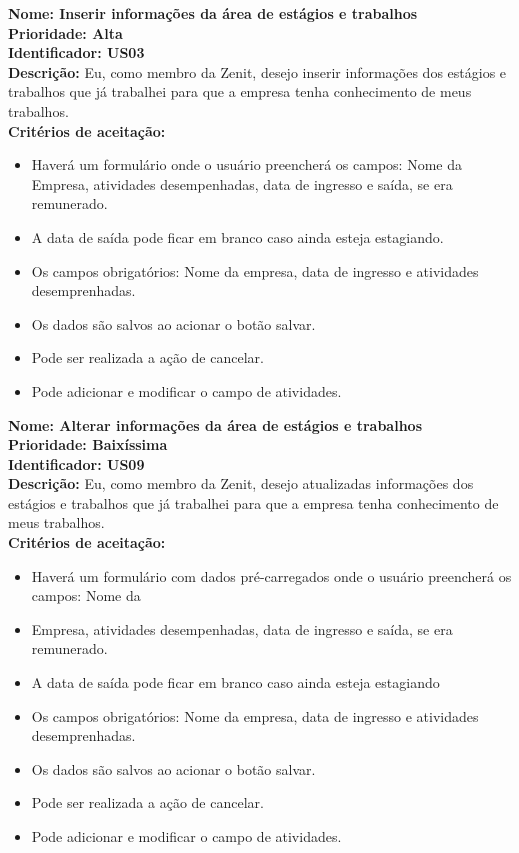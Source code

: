 \begin{anexosenv}
\indent \textbf{Nome: Inserir informações da área de estágios e trabalhos\\
    \indent Prioridade: Alta\\
    \indent Identificador: US03\\
    \indent Descrição:} Eu, como membro da Zenit, desejo inserir informações dos estágios e trabalhos que já trabalhei para que a empresa tenha conhecimento de meus trabalhos.\\
\indent \textbf{Critérios de aceitação:}
\begin{itemize}
    \item Haverá um formulário onde o usuário preencherá os campos: Nome da Empresa, atividades desempenhadas, data de ingresso e saída, se era remunerado.
    \item A data de saída pode ficar em branco caso ainda esteja estagiando.
    \item Os campos obrigatórios: Nome da empresa, data de ingresso e atividades desemprenhadas.
    \item Os dados são salvos ao acionar o botão salvar.
    \item Pode ser realizada a ação de cancelar.
    \item Pode adicionar e modificar o campo de atividades.
\end{itemize}

\indent \textbf{Nome: Alterar informações da área de estágios e trabalhos\\
    \indent Prioridade: Baixíssima\\
    \indent Identificador: US09\\
    \indent Descrição:} Eu, como membro da Zenit, desejo atualizadas informações dos estágios e trabalhos que já trabalhei para que a empresa tenha conhecimento de meus trabalhos.\\
\indent \textbf{Critérios de aceitação:}
\begin{itemize}
    \item Haverá um formulário com dados pré-carregados onde o usuário preencherá os campos: Nome da \item Empresa, atividades desempenhadas, data de ingresso e saída, se era remunerado.
    \item A data de saída pode ficar em branco caso ainda esteja estagiando
    \item Os campos obrigatórios: Nome da empresa, data de ingresso e atividades desemprenhadas.
    \item Os dados são salvos ao acionar o botão salvar.
    \item Pode ser realizada a ação de cancelar.
    \item Pode adicionar e modificar o campo de atividades.
\end{itemize}


\end{anexosenv}
